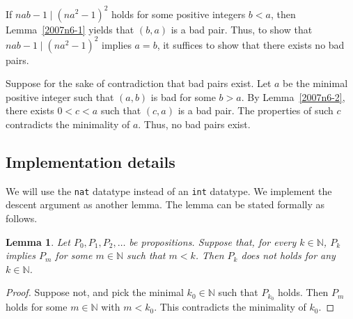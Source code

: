 \documentclass{article}
\newcommand{\N}{\mathbb{N}}
\newtheorem{lemma}{Lemma}
\begin{document}
If $nab - 1 \mid (na^2 - 1)^2$ holds for some positive integers $b < a$, then Lemma~\ref{2007n6-1} yields that $(b, a)$ is a bad pair.
Thus, to show that $nab - 1 \mid (na^2 - 1)^2$ implies $a = b$, it suffices to show that there exists no bad pairs.

Suppose for the sake of contradiction that bad pairs exist.
Let $a$ be the minimal positive integer such that $(a, b)$ is bad for some $b > a$.
By Lemma~\ref{2007n6-2}, there exists $0 < c < a$ such that $(c, a)$ is a bad pair.
The properties of such $c$ contradicts the minimality of $a$.
Thus, no bad pairs exist.



\subsection*{Implementation details}

We will use the \texttt{nat} datatype instead of an \texttt{int} datatype.
We implement the descent argument as another lemma.
The lemma can be stated formally as follows.

\begin{lemma}\label{2007n6-3}
Let $P_0, P_1, P_2, \ldots$ be propositions.
Suppose that, for every $k \in \N$, $P_k$ implies $P_m$ for some $m \in \N$ such that $m < k$.
Then $P_k$ does not holds for any $k \in \N$.
\end{lemma}
\begin{proof}
Suppose not, and pick the minimal $k_0 \in \N$ such that $P_{k_0}$ holds.
Then $P_m$ holds for some $m \in \N$ with $m < k_0$.
This contradicts the minimality of $k_0$.
\end{proof}
\end{document}
